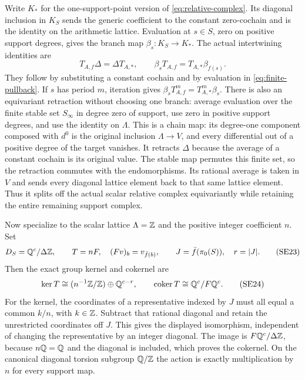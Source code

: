 Write $K_*$ for the one-support-point version of
\eqref{eq:relative-complex}. Its diagonal inclusion in $K_S$ sends
the generic coefficient to the constant zero-cochain and is the
identity on the arithmetic lattice. Evaluation at $s\in S$, zero
on positive support degrees, gives the branch map $\beta_s:K_S\to K_*$.
The actual intertwining identities are
\[
 T_{A,f}\Delta=\Delta T_{A,*},\qquad
 \beta_sT_{A,f}=T_{A,*}\beta_{f(s)}.
 \tag{SE22}\label{eq:branch-action}
\]
They follow by substituting a constant cochain and by evaluation in
\eqref{eq:finite-pullback}. If $s$ has period $m$, iteration gives
$\beta_sT_{A,f}^m=T_{A,*}^m\beta_s$.
There is also an equivariant retraction without choosing one branch:
average evaluation over the finite stable set $S_\infty$ in degree
zero of support, use zero in positive support degrees, and use the
identity on $\Lambda$. This is a chain map: its degree-one component
composed with $d^0$ is the original inclusion $\Lambda\to V$, and
every differential out of a positive degree of the target vanishes.
It retracts $\Delta$ because the average of a constant cochain is its
original value. The stable map permutes this finite set,
so the retraction commutes with the endomorphisms. Its rational
average is taken in $V$ and sends every diagonal lattice element
back to that same lattice element. Thus it splits off the actual
scalar relative complex equivariantly while retaining the entire
remaining support complex.

Now specialize to the scalar lattice $\Lambda=\mathbb Z$ and the positive
integer coefficient $n$. Set
\[
 D_S=\mathbb Q^c/\Delta\mathbb Z,\qquad
 T=nF,\quad (Fv)_b=v_{\bar f(b)},\qquad
 J=\bar f(\pi_0(S)),\quad r=|J|.
 \tag{SE23}\label{eq:full-degree-group}
\]
Then the exact group kernel and cokernel are
\[
 \ker T\cong(n^{-1}\mathbb Z/\mathbb Z)\oplus\mathbb Q^{c-r},\qquad
 \operatorname{coker} T\cong\mathbb Q^c/F\mathbb Q^c.
 \tag{SE24}\label{eq:noninvertible-degree}
\]
For the kernel, the coordinates of a representative indexed by $J$
must all equal a common $k/n$, with $k\in\mathbb Z$. Subtract that rational
diagonal and retain the unrestricted coordinates off $J$. This gives
the displayed isomorphism, independent of changing the representative
by an integer diagonal. The image is $F\mathbb Q^c/\Delta\mathbb Z$, because
$n\mathbb Q=\mathbb Q$ and the diagonal is included, which proves the cokernel.
On the canonical diagonal torsion subgroup $\mathbb Q/\mathbb Z$ the action is
exactly multiplication by $n$ for every support map.

